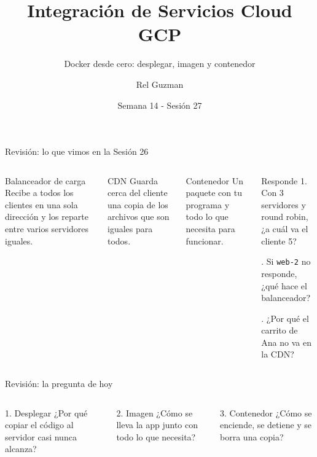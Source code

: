 \documentclass[aspectratio=169,10pt,c]{beamer}
\title{Integración de Servicios Cloud GCP}
\subtitle{Docker desde cero: desplegar, imagen y contenedor}
\date{Semana 14 - Sesión 27}
\author{Rel Guzman}
\begin{document}
{\maketitle}

\begin{frame}{Revisión: lo que vimos en la Sesión 26}
\begin{columns}[T,onlytextwidth]
\begin{block}{Balanceador de carga}
\small Recibe a todos los clientes en una sola dirección y los reparte entre varios servidores iguales.
\end{block}
\begin{block}{CDN}
\small Guarda cerca del cliente una copia de los archivos que son iguales para todos.
\end{block}
\begin{block}{Contenedor}
\small Un paquete con tu programa y todo lo que necesita para funcionar.
\end{block}
\begin{alertblock}{Responde}
\small
1. Con 3 servidores y round robin, ¿a cuál va el cliente 5?\par{}. Si \texttt{web-2} no responde, ¿qué hace el balanceador?\par{}. ¿Por qué el carrito de Ana no va en la CDN?
\end{alertblock}
\end{columns}
\end{frame}

\begin{frame}{Revisión: la pregunta de hoy}
\begin{center}
\end{center}
\vspace{3mm}
\begin{columns}[T,onlytextwidth]
\begin{block}{1. Desplegar}
\small ¿Por qué copiar el código al servidor casi nunca alcanza?
\end{block}
\begin{block}{2. Imagen}
\small ¿Cómo se lleva la app junto con todo lo que necesita?
\end{block}
\begin{block}{3. Contenedor}
\small ¿Cómo se enciende, se detiene y se borra una copia?
\end{block}
\end{columns}
\end{frame}
\end{document}

